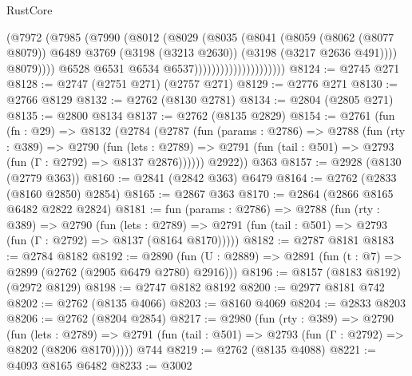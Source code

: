 \begin{lexlean}{RustCore}
\begin{coremodule}
                                          (@7972
                                            (@7985
                                              (@7990
                                                (@8012
                                                  (@8029
                                                    (@8035
                                                      (@8041
                                                        (@8059
                                                          (@8062 (@8077 @8079))
                                                          @6489
                                                          @3769
                                                          (@3198 (@3213 @2630))
                                                          (@3198 (@3217 @2636 @491))))
                                                      @8079))))
                                              @6528
                                              @6531
                                              @6534
                                              @6537)))))))))))))))))))))
@8124 := @2745 @271
@8128 := @2747 (@2751 @271) (@2757 @271)
@8129 := @2776 @271
@8130 := @2766 @8129
@8132 := @2762 (@8130 @2781)
@8134 := @2804 (@2805 @271)
@8135 := @2800 @8134
@8137 := @2762 (@8135 @2829)
@8154 := @2761
    (fun (fn : @29) =>
    @8132
      (@2784
        (@2787
          (fun (params : @2786) =>
          @2788
            (fun (rty : @389) =>
            @2790
              (fun (lets : @2789) =>
              @2791 (fun (tail : @501) => @2793 (fun (Γ : @2792) => @8137 @2876))))))
        @2922))
    @363
@8157 := @2928 (@8130 (@2779 @363))
@8160 := @2841 (@2842 @363) @6479
@8164 := @2762 (@2833 (@8160 @2850) @2854)
@8165 := @2867 @363
@8170 := @2864 (@2866 @8165 @6482 @2822 @2824)
@8181 := fun (params : @2786) =>
  @2788
    (fun (rty : @389) =>
    @2790
      (fun (lets : @2789) =>
      @2791 (fun (tail : @501) => @2793 (fun (Γ : @2792) => @8137 (@8164 @8170)))))
@8182 := @2787 @8181
@8183 := @2784 @8182
@8192 := @2890 (fun (U : @2889) => @2891 (fun (t : @7) => @2899 (@2762 (@2905 @6479 @2780) @2916)))
@8196 := @8157 (@8183 @8192) (@2972 @8129)
@8198 := @2747 @8182 @8192
@8200 := @2977 @8181 @742
@8202 := @2762 (@8135 @4066)
@8203 := @8160 @4069
@8204 := @2833 @8203
@8206 := @2762 (@8204 @2854)
@8217 := @2980
    (fun (rty : @389) =>
    @2790
      (fun (lets : @2789) =>
      @2791 (fun (tail : @501) => @2793 (fun (Γ : @2792) => @8202 (@8206 @8170)))))
    @744
@8219 := @2762 (@8135 @4088)
@8221 := @4093 @8165 @6482
@8233 := @3002

\end{coremodule}
\end{lexlean}

